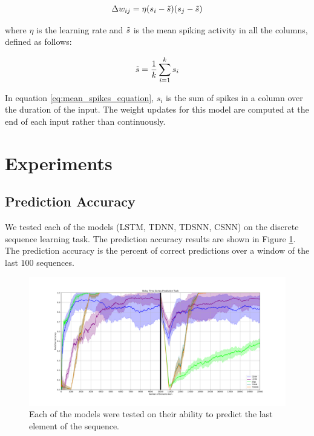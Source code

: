 \documentclass{article}
\begin{document}
\begin{equation}
    \Delta w_{ij} = \eta(s_{i} - \Tilde{s})(s_{j} -  \Tilde{s})
\end{equation}

where $\eta$ is the learning rate and $\Tilde{s}$ is the mean spiking activity in all the columns, defined as follows:

\begin{equation}
    \Tilde{s} = \frac{1}{k} \sum_{i = 1}^{k}{s_i}
    \label{eq:mean_spikes_equation}
\end{equation}

In equation \ref{eq:mean_spikes_equation}, $s_i$ is the sum of spikes in a column over the duration of the input. The weight updates for this model are computed at the end of each input rather than continuously.



\section*{Experiments}

\subsection*{Prediction Accuracy}

We tested each of the models (LSTM, TDNN, TDSNN, CSNN) on the discrete sequence learning task. The prediction accuracy results are shown in Figure \ref{fig:prediction-accuracy}. The prediction accuracy is the percent of correct predictions over a window of the last $100$ sequences.

\begin{figure}[H]
    \centering
    \includegraphics[width=0.9\linewidth]{../results/artificial.png}
    \caption{Each of the models were tested on their ability to predict the last element of the sequence.}
    \label{fig:prediction-accuracy}
\end{figure}
\end{document}
